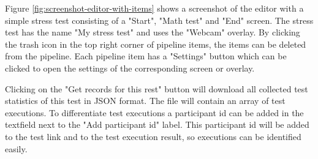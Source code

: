Figure \ref{fig:screenshot-editor-with-items} shows a screenshot of the editor with a simple stress test consisting of a "Start", "Math test" and "End" screen.
The stress test has the name "My stress test" and uses the "Webcam" overlay.
By clicking the trash icon in the top right corner of pipeline items, the items can be deleted from the pipeline.
Each pipeline item has a "Settings" button which can be clicked to open the settings of the corresponding screen or overlay.

Clicking on the "Get records for this rest" button will download all collected test statistics of this test in JSON format.
The file will contain an array of test executions.
To differentiate test executions a participant id can be added in the textfield next to the "Add participant id" label.
This participant id will be added to the test link and to the test execution result, so executions can be identified easily.
